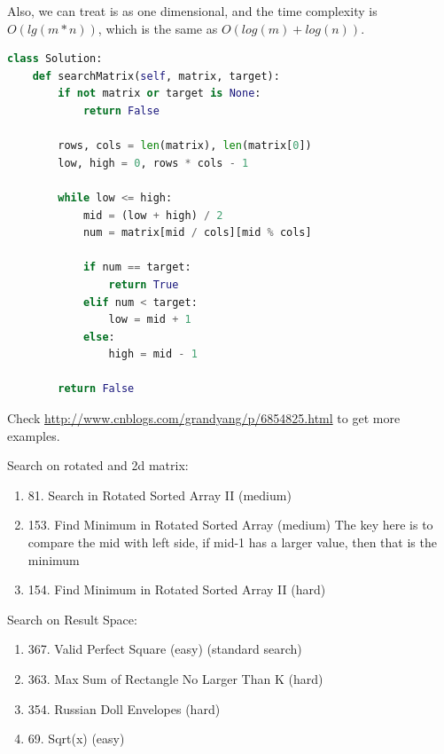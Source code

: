 \documentclass[../searching.tex]{subfiles}
\begin{document}
\begin{enumerate}
Also, we can treat is as one dimensional, and the time complexity is $O(lg(m*n))$, which is the same as $O(log(m)+log(n))$.
\begin{lstlisting}[language = Python]
class Solution:
    def searchMatrix(self, matrix, target):
        if not matrix or target is None:
            return False

        rows, cols = len(matrix), len(matrix[0])
        low, high = 0, rows * cols - 1
        
        while low <= high:
            mid = (low + high) / 2
            num = matrix[mid / cols][mid % cols]

            if num == target:
                return True
            elif num < target:
                low = mid + 1
            else:
                high = mid - 1
        
        return False
\end{lstlisting}
\end{enumerate}

Check \url{http://www.cnblogs.com/grandyang/p/6854825.html} to get more examples.

Search on rotated and 2d matrix:
\begin{enumerate}
    \item 81. Search in Rotated Sorted Array II (medium) 
    \item 153. Find Minimum in Rotated Sorted Array (medium) The key here is to compare the mid with left side, if mid-1 has a larger value, then that is the minimum 
    \item 154. Find Minimum in Rotated Sorted Array II (hard)
\end{enumerate}
Search on Result Space:
\begin{enumerate}
    \item 367. Valid Perfect Square (easy) (standard search)
    \item 363. Max Sum of Rectangle No Larger Than K (hard)
    \item 354. Russian Doll Envelopes (hard)
    \item 69. Sqrt(x) (easy)
\end{enumerate}
\end{document}
